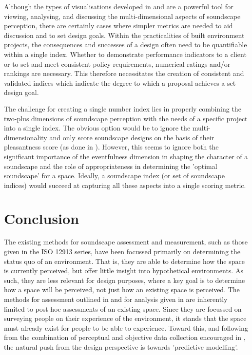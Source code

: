 \documentclass[
  authoryear,
  preprint,
  1p]{elsarticle}
\begin{document}
Although the types of visualisations developed in
\citep{Mitchell2022How} and \citep{Cain2013development} are a powerful
tool for viewing, analysing, and discussing the multi-dimensional
aspects of soundscape perception, there are certainly cases where
simpler metrics are needed to aid discussion and to set design goals.
Within the practicalities of built environment projects, the
consequences and successes of a design often need to be quantifiable
within a single index. Whether to demonstrate performance indicators to
a client or to set and meet consistent policy requirements, numerical
ratings and/or rankings are necessary. This therefore necessitates the
creation of consistent and validated indices which indicate the degree
to which a proposal achieves a set design goal.

The challenge for creating a single number index lies in properly
combining the two-plus dimensions of soundscape perception with the
needs of a specific project into a single index. The obvious option
would be to ignore the multi-dimensionality and only score soundscape
designs on the basis of their pleasantness score (as done in
\citep{Ooi2022Probably}). However, this seems to ignore both the
significant importance of the eventfulness dimension in shaping the
character of a soundscape and the role of appropriateness in determining
the 'optimal soundscape' for a space. Ideally, a soundscape index (or
set of soundscape indices) would succeed at capturing all these aspects
into a single scoring metric.

\section{Conclusion}\label{conclusion}

The existing methods for soundscape assessment and measurement, such as
those given in the ISO 12913 series, have been focussed primarily on
determining the status quo of an environment. That is, they are able to
determine how the space is currently perceived, but offer little insight
into hypothetical environments. As such, they are less relevant for
design purposes, where a key goal is to determine how a space will be
perceived, not just how an existing space is perceived. The methods for
assessment outlined in \citet{ISO12913Part2} and for analysis given in
\citet{ISO12913Part3} are inherently limited to post hoc assessments of
an existing space. Since they are focussed on surveying people on their
experience of the environment, it stands that the space must already
exist for people to be able to experience. Toward this, and following
from the combination of perceptual and objective data collection
encouraged in \citet{ISO12913Part2}, the natural push from the design
perspective is towards 'predictive modelling'.


\renewcommand\refname{References}
  
\end{document}
